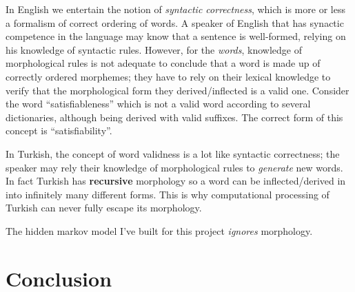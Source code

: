 \documentclass{article}
\begin{document}
In English we entertain the notion of \emph{syntactic correctness}, which is
more or less a formalism of correct ordering of words. A speaker of English that has
synactic competence in the language \citep{bachman1990} may know that a sentence
is well-formed, relying on his knowledge of syntactic rules. However, for the
\textit{words}, knowledge of morphological rules is not adequate to conclude
that a word is made up of correctly ordered morphemes; they have to rely on
their lexical knowledge to verify that the morphological form they
derived/inflected is a valid one. Consider the word ``satisfiableness'' which
is not a valid word according to several dictionaries, although being derived
with valid suffixes. The correct form of this concept is ``satisfiability''.

In Turkish, the concept of word validness is a lot like syntactic correctness;
the speaker may rely their knowledge of morphological rules to \emph{generate}
new words. In fact Turkish has \textbf{recursive} morphology \citep{kabak2001}
so a word can be inflected/derived in into infinitely many different forms. This
is why computational processing of Turkish can never fully escape its
morphology.

The hidden markov model I've built for this project \emph{ignores} morphology.

\section{Conclusion}





\end{document}
